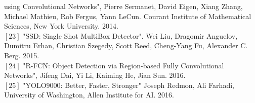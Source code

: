 \documentclass{bmvc2k}
\begin{document}
using Convolutional Networks", Pierre Sermanet, David Eigen, Xiang Zhang, Michael Mathieu, Rob Fergus, Yann LeCun. Courant Institute of Mathematical Sciences, New York University. 2014.\\
$\left[23\right]$  "SSD: Single Shot MultiBox Detector".
Wei Liu, Dragomir Anguelov, Dumitru Erhan, Christian Szegedy, Scott Reed, Cheng-Yang Fu, Alexander C. Berg. 2015.\\
$\left[24\right]$  "R-FCN: Object Detection via Region-based Fully Convolutional Networks", Jifeng Dai, Yi Li, Kaiming He, Jian Sun. 2016.\\
$\left[25\right]$  "YOLO9000: Better, Faster, Stronger"
Joseph Redmon, Ali Farhadi, University of Washington, Allen Institute for AI. 2016.\\
\end{document}
